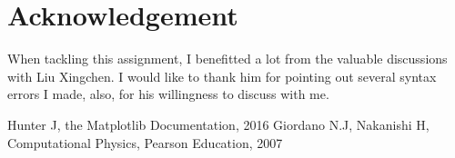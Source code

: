 \documentclass[10pt,a4paper]{article}
\begin{document}
    \section*{Acknowledgement}
    When tackling this assignment, I benefitted a lot from the valuable discussions with Liu Xingchen. I would like to thank him for pointing out several syntax errors I made, also, for his willingness to discuss with me.
    
    \begin{thebibliography}{99}
    	\bibitem{}Hunter J, the Matplotlib Documentation, 2016
    	\bibitem{}Giordano N.J, Nakanishi H, Computational Physics, Pearson Education, 2007
    \end{thebibliography} 
\end{document}
